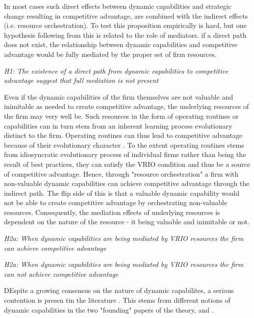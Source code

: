 \documentclass[review,fleqn]{elsarticle}\usepackage[]{graphicx}\usepackage[]{color}
\begin{document}
In most cases such direct effects between dynamic capabilities and strategic change
resulting in competitive advantage, are combined with the indirect effects (i.e. resource
orchestration). To test this proposition empirically is hard, but one hypothesis following
from this is related to the role of mediators. if a direct path does not exist, the
relationship between dynamic capabilities and competitive advantage would be fully
mediated by the proper set of firm resources. 

\emph{H1: The existence of a direct path from dynamic capabilities to competitive advantage
suggest that full mediation is not present}
 

Even if the dynamic capabilities of the firm themselves are not valuable and inimitable as
needed to create competitive advantage, the underlying resources of the firm may very well
be. Such resources in the form of operating routines or capabilities can in turn stem from
an inherent learning process evolutionary distinct to the firm. Operating routines can
thus lead to competitive advantage because of their evolutionary character
\citep{Nelson1982,Winter2003}. To the extent operating routines stems from idiosyncratic
evolutionary process of individual firms rather than being the result of best practices,
they can satisfy the VRIO condition and thus be a source of competitive advantage.  Hence,
through "resource orchestration" a firm with non-valuable dynamic capabilities can achieve
competitive advantage through the indirect path. The flip side of this is that a valuable
dynamic capability would not be able to create competitive advantage by orchestrating
non-valuable resources. Consequently, the mediation effects of underlying resources is
dependent on the nature of the resource - it being valuable and inimitable or not.

\emph{H2a: When dynamic capabilities are being mediated by VRIO resources the firm can
  achieve competitive advantage}

\emph{H2a: When dynamic capabilities are being mediated by VRIO resources the firm can not
  achieve competitive advantage}

DEspite a growing consensus on the nature of dynamic capabilites, a serious contention is
presen tin the literature \citep{Peteraf2013}. This stems from different notions of
dynamic capabilities in the two "founding" papers of the theory, \cite{Eisenhardt2000} and
\cite{Teece1997}.
\end{document}
